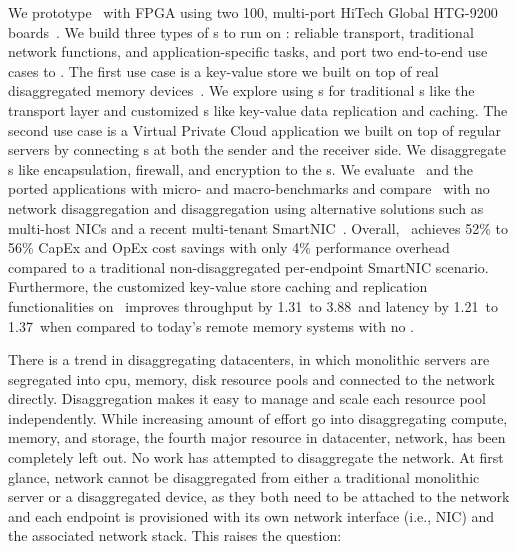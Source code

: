 


We prototype \snic\ with FPGA using two 100\Gbps, multi-port HiTech Global HTG-9200 boards~\cite{htg9200}.
We build three types of \nt{}s to run on \snic:
reliable transport, traditional network functions, and application-specific tasks, and port two end-to-end use cases to \snic.
The first use case is a key-value store we built on top of real disaggregated memory devices~\cite{Clio}.
We explore using \snic{}s for traditional \nt{}s like the transport layer and customized \nt{}s like key-value data replication and caching.
The second use case is a Virtual Private Cloud application we built on top of regular servers by connecting \snic{}s at both the sender and the receiver side.
We disaggregate \nt{}s like encapsulation, firewall, and encryption to the \snic{}s.
We evaluate \snic\ and the ported applications with micro- and macro-benchmarks and compare \snic\ with no network disaggregation and disaggregation using alternative solutions such as multi-host NICs and a recent multi-tenant SmartNIC~\cite{panic-osdi20}.
Overall, \snic\ achieves 52\% to 56\% CapEx and OpEx cost savings with only 4\% performance overhead compared to a traditional non-disaggregated per-endpoint SmartNIC scenario.
Furthermore, the customized key-value store caching and replication functionalities on \snic\ improves throughput by 1.31\x\ to 3.88\x\ and latency by 1.21\x\ to 1.37\x\ when compared to today's remote memory systems with no \snic.





There is a trend in disaggregating datacenters,
in which monolithic servers are segregated into cpu, memory, disk
resource pools and connected to the network directly.
Disaggregation makes it easy to manage and scale each resource pool independently.
While increasing amount of effort go into disaggregating compute,
memory, and storage, the fourth major resource in datacenter, network,
has been completely left out. No work has attempted to disaggregate the network.
At first glance, network cannot be disaggregated from either
a traditional monolithic server or a disaggregated device, as
they both need to be attached to the network
and each endpoint is provisioned with its own network interface (i.e., NIC)
and the associated network stack. This raises the question:


